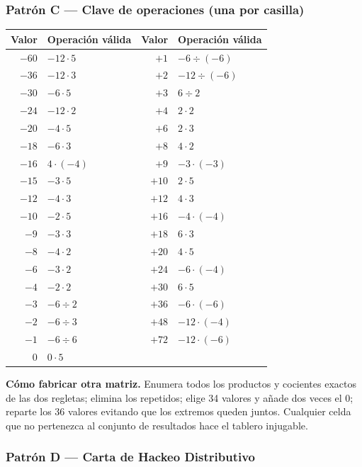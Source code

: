 \documentclass[12pt, letterpaper]{article}
\begin{document}
\subsubsection{Patrón C — Clave de operaciones (una por casilla)}

\begin{longtable}{@{}r l r l@{}}
\toprule
\textbf{Valor} & \textbf{Operación válida} & \textbf{Valor} & \textbf{Operación válida}\\
\midrule
\endhead
\bottomrule
\endfoot
$-60$ & $-12\cdot 5$ & $+1$ & $-6\div(-6)$\\
$-36$ & $-12\cdot 3$ & $+2$ & $-12\div(-6)$\\
$-30$ & $-6\cdot 5$ & $+3$ & $6\div 2$\\
$-24$ & $-12\cdot 2$ & $+4$ & $2\cdot 2$\\
$-20$ & $-4\cdot 5$ & $+6$ & $2\cdot 3$\\
$-18$ & $-6\cdot 3$ & $+8$ & $4\cdot 2$\\
$-16$ & $4\cdot(-4)$ & $+9$ & $-3\cdot(-3)$\\
$-15$ & $-3\cdot 5$ & $+10$ & $2\cdot 5$\\
$-12$ & $-4\cdot 3$ & $+12$ & $4\cdot 3$\\
$-10$ & $-2\cdot 5$ & $+16$ & $-4\cdot(-4)$\\
$-9$ & $-3\cdot 3$ & $+18$ & $6\cdot 3$\\
$-8$ & $-4\cdot 2$ & $+20$ & $4\cdot 5$\\
$-6$ & $-3\cdot 2$ & $+24$ & $-6\cdot(-4)$\\
$-4$ & $-2\cdot 2$ & $+30$ & $6\cdot 5$\\
$-3$ & $-6\div 2$ & $+36$ & $-6\cdot(-6)$\\
$-2$ & $-6\div 3$ & $+48$ & $-12\cdot(-4)$\\
$-1$ & $-6\div 6$ & $+72$ & $-12\cdot(-6)$\\
$0$ & $0\cdot 5$ & & \\
\end{longtable}

\begin{cuadroadvertencia}
\textbf{Cómo fabricar otra matriz.} Enumera todos los productos y cocientes exactos de las dos regletas; elimina los repetidos; elige 34 valores y añade dos veces el $0$; reparte los 36 valores evitando que los extremos queden juntos. Cualquier celda que no pertenezca al conjunto de resultados hace el tablero injugable.
\end{cuadroadvertencia}

\subsubsection{Patrón D — Carta de Hackeo Distributivo}
\end{document}
